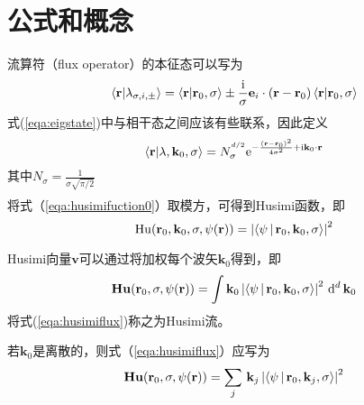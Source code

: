 \documentclass[UTF8]{ctexart}
\begin{document}
\section*{公式和概念}
流算符（flux operator）的本征态可以写为
\begin{equation}
    \braket{\mathbf{r}|\mathbf{\lambda}_{\sigma,i,\pm}}=\braket{\mathbf{r}|\mathbf{r}_0,\sigma}\pm\frac{\mathrm{i}}{\sigma}\mathbf{e}_i\cdot(\mathbf{r}-\mathbf{r}_0)\braket{\mathbf{r}|\mathbf{r}_0,\sigma}
    \label{eqa:eigstate}
\end{equation}
式(\ref{eqa:eigstate})中与相干态之间应该有些联系，因此定义
%
\begin{equation}
    \braket{\mathbf{r}|\mathbf{\lambda},\mathbf{k}_0,\sigma}=N^{^{d/2}}_{\sigma}\mathrm{e}^{-\frac{(\mathbf{r}-\mathbf{r}_0)^2}{4\sigma^2}+\mathrm{i}\mathbf{k}_0\cdot\mathbf{r}}
    \label{eqa:newdefine}
\end{equation}
其中$N_\sigma=\frac{1}{\sigma\sqrt{\pi/2}}$
%
\begin{equation}
    \begin{aligned}

    \end{aligned}
\end{equation}
将式（\ref{eqa:husimifuction0}）取模方，可得到Husimi函数，即
\begin{equation}
    \mathrm{Hu}(\mathbf{r}_0,\mathbf{k}_0, \sigma,\psi(\mathbf{r}))=\left\lvert\Braket{\mathbf{\psi}|\mathbf{r}_0,\mathbf{k}_0,\sigma}\right\rvert^2  
    \label{eqa:husimifuction1}
\end{equation}

Husimi向量$\mathbf{v}$可以通过将加权每个波矢$\mathbf{k}_0$得到，即
\begin{equation}
    \mathbf{Hu}(\mathbf{r}_0,\sigma,\psi(\mathbf{r}))=\int \mathbf{k}_0\left\lvert\Braket{\mathbf{\psi}|\mathbf{r}_0,\mathbf{k}_0,\sigma}\right\rvert^2\,\mathrm{d}^d\,\mathbf{k}_0
    \label{eqa:husimiflux}
    \end{equation}
将式(\ref{eqa:husimiflux})称之为Husimi流。

若$\mathbf{k}_0$是离散的，则式（\ref{eqa:husimiflux}）应写为
\begin{equation}
    \mathbf{Hu}(\mathbf{r}_0,\sigma,\psi(\mathbf{r}))= \sum_{j}\,\mathbf{k}_j\left\lvert\Braket{\mathbf{\psi}|\mathbf{r}_0,\mathbf{k}_j,\sigma}\right\rvert^2
    \label{eqa:dishusimiflux}
\end{equation}
\end{document}
